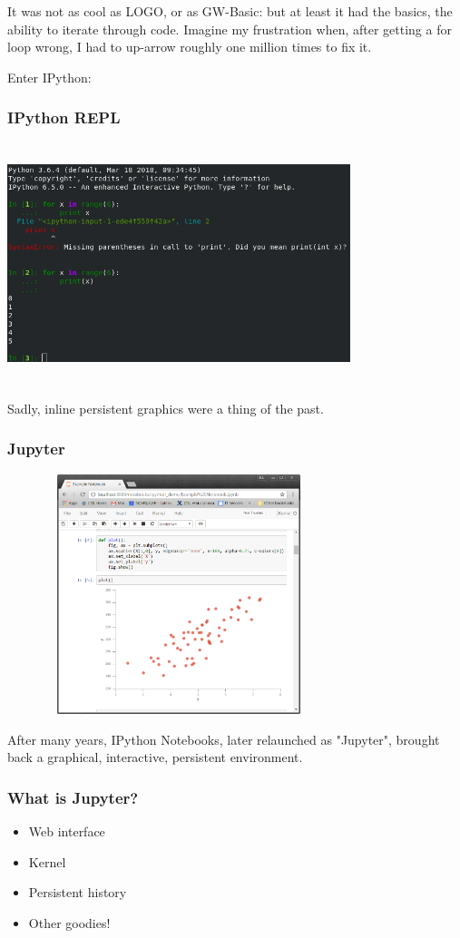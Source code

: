 It was not as cool as LOGO,
or as GW-Basic:
but at least it had the basics,
the ability to iterate through code.
Imagine my frustration when,
after getting a for loop wrong,
I had to up-arrow roughly one million times to
fix it.

Enter IPython:


\begin{frame}
\frametitle{IPython REPL}

\includegraphics[height=7cm,width=10cm]{ipython.png}

\end{frame}

Sadly,
inline persistent graphics
were a thing of the past.

\begin{frame}
\frametitle{Jupyter}

\includegraphics[height=7cm,width=10cm]{jupyter-notebook-page.png}

\end{frame}

After many years,
IPython Notebooks,
later relaunched as "Jupyter",
brought back a graphical,
interactive,
persistent environment.

\begin{frame}
\frametitle{What is Jupyter?}

\begin{itemize}
\item Web interface
\item Kernel
\item Persistent history
\item Other goodies!
\end{itemize}

\end{frame}


